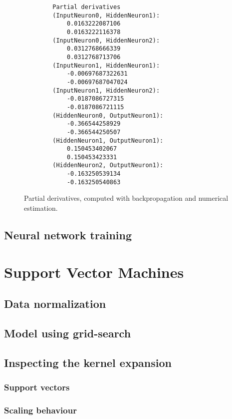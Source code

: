 \documentclass[a4paper]{article}
\begin{document}
\begin{figure}[H]
	\begin{lstlisting}
        Partial derivatives
        (InputNeuron0, HiddenNeuron1):
        	0.0163222087106
        	0.0163222116378
        (InputNeuron0, HiddenNeuron2):
        	0.0312768666339
        	0.0312768713706
        (InputNeuron1, HiddenNeuron1):
        	-0.00697687322631
        	-0.00697687047024
        (InputNeuron1, HiddenNeuron2):
        	-0.0187086727315
        	-0.0187086721115
        (HiddenNeuron0, OutputNeuron1):
        	-0.366544258929
        	-0.366544250507
        (HiddenNeuron1, OutputNeuron1):
        	0.150453402067
        	0.150453423331
        (HiddenNeuron2, OutputNeuron1):
        	-0.163250539134
        	-0.163250540863
        \end{lstlisting}
	\caption{Partial derivatives, computed with backpropagation and numerical estimation.}
	\label{fig:partial_derivatives}
\end{figure}

\subsection{Neural network training}

\section{Support Vector Machines}

\subsection{Data normalization}

\subsection{Model using grid-search}

\subsection{Inspecting the kernel expansion}

\subsubsection{Support vectors}

\subsubsection{Scaling behaviour}
\end{document}
